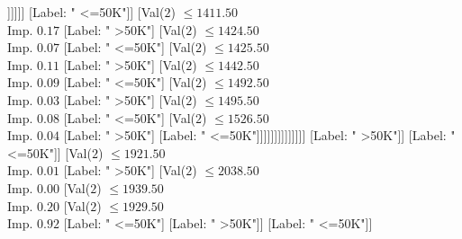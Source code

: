 \documentclass[margin=10pt]{standalone}
\begin{document}
\begin{forest}
																														[Val($2$) $ \leq 1195.50$ \\ Imp. $0.09$
																															[Label: " >50K"]
																															[Val($2$) $ \leq 1196.50$ \\ Imp. $0.06$
																																[Label: " <=50K"]
																																[Val($2$) $ \leq 1236.50$ \\ Imp. $0.02$
																																	[Label: " <=50K"]
																																	[Val($2$) $ \leq 1263.50$ \\ Imp. $0.25$
																																		[Label: " <=50K"]
																																		[Label: " >50K"]]]]]]
																													[Label: " <=50K"]]
																												[Val($2$) $ \leq 1411.50$ \\ Imp. $0.17$
																													[Label: " >50K"]
																													[Val($2$) $ \leq 1424.50$ \\ Imp. $0.07$
																														[Label: " <=50K"]
																														[Val($2$) $ \leq 1425.50$ \\ Imp. $0.11$
																															[Label: " >50K"]
																															[Val($2$) $ \leq 1442.50$ \\ Imp. $0.09$
																																[Label: " <=50K"]
																																[Val($2$) $ \leq 1492.50$ \\ Imp. $0.03$
																																	[Label: " >50K"]
																																	[Val($2$) $ \leq 1495.50$ \\ Imp. $0.08$
																																		[Label: " <=50K"]
																																		[Val($2$) $ \leq 1526.50$ \\ Imp. $0.04$
																																			[Label: " >50K"]
																																			[Label: " <=50K"]]]]]]]]]]]]]]
																						[Label: " >50K"]]
																					[Label: " <=50K"]]
																				[Val($2$) $ \leq 1921.50$ \\ Imp. $0.01$
																					[Label: " >50K"]
																					[Val($2$) $ \leq 2038.50$ \\ Imp. $0.00$
																						[Val($2$) $ \leq 1939.50$ \\ Imp. $0.20$
																							[Val($2$) $ \leq 1929.50$ \\ Imp. $0.92$
																								[Label: " <=50K"]
																								[Label: " >50K"]]
																							[Label: " <=50K"]]

\end{forest}
\end{document}
